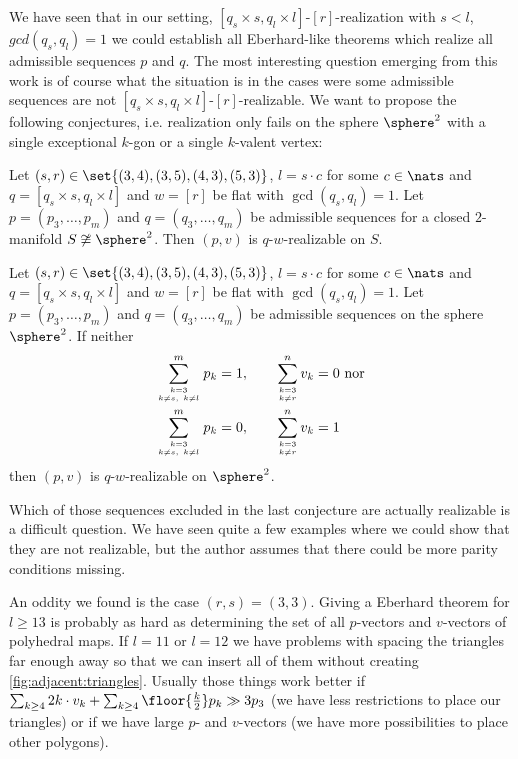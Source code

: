 \label{sec:closing:remarks}

We have seen that in our setting, $[q_s \times s, q_l \times l]$-$[r]$-realization with $s < l$, $gcd(q_s, q_l) = 1$ we could establish all {\sc Eberhard}-like theorems which realize all admissible sequences $p$ and $q$. The most interesting question emerging from this work is of course what the situation is in the cases were some admissible sequences are not $[q_s \times s, q_l \times l]$-$[r]$-realizable. 
\clearpage
We want to propose the following conjectures, i.e. realization only fails on the sphere $\sphere^2$ with a single exceptional $k$-gon or a single $k$-valent vertex:

\begin{conjecture}
  Let $(s, r) \in \set{(3, 4), (3, 5), (4, 3), (5, 3)}$, $l = s \cdot c$ for some $c \in \nats$ and $q = [q_s \times s, q_l \times l]$ and $w = [r]$ be flat with $\gcd(q_s, q_l) = 1$. Let $p = (p_3, \dots, p_m)$ and $q = (q_3, \dots, q_m)$ be admissible sequences for a closed $2$-manifold $S \not\cong \sphere^2$. Then $(p, v)$ is $q$-$w$-realizable on $S$.
\end{conjecture}

\begin{conjecture}
  Let $(s, r) \in \set{(3, 4), (3, 5), (4, 3), (5, 3)}$, $l = s \cdot c$ for some $c \in \nats$ and $q = [q_s \times s, q_l \times l]$ and $w = [r]$ be flat with $\gcd(q_s, q_l) = 1$. Let $p = (p_3, \dots, p_m)$ and $q = (q_3, \dots, q_m)$ be admissible sequences on the sphere $\sphere^2$. If neither
  \begin{align*}
    \sum_{k = 3 \atop k \neq s, ~k \neq l}^m p_k = 1, \qquad&\sum_{k = 3 \atop k \neq r}^n v_k = 0 \text{~nor} \\
    \sum_{k = 3 \atop k \neq s, ~k \neq l}^m p_k = 0, \qquad&\sum_{k = 3 \atop k \neq r}^n v_k = 1
  \end{align*}
then $(p, v)$ is $q$-$w$-realizable on $\sphere^2$.
\end{conjecture}

Which of those sequences excluded in the last conjecture are actually realizable is a difficult question. We have seen quite a few examples where we could show that they are not realizable, but the author assumes that there could be more parity conditions missing.

An oddity we found is the case $(r, s) = (3, 3)$. Giving a {\sc Eberhard} theorem for $l \geq 13$ is probably as hard as determining the set of all $p$-vectors and $v$-vectors of polyhedral maps. If $l = 11$ or $l = 12$ we have problems with spacing the triangles far enough away so that we can insert all of them without creating \autoref{fig:adjacent:triangles}. Usually those things work better if $\sum_{k \geq 4} 2k \cdot v_k + \sum_{k \geq 4} \floor{\tfrac{k}{2}} p_k \gg 3p_3$ (we have less restrictions to place our triangles) or if we have large $p$- and $v$-vectors (we have more possibilities to place other polygons).

